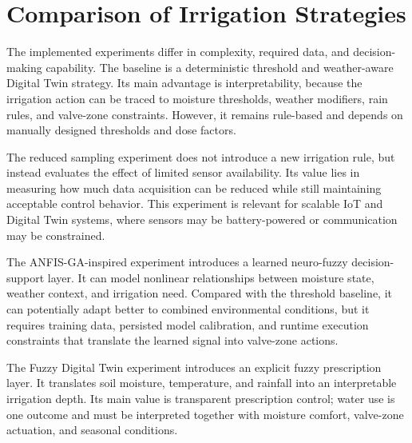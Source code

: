 \section{Comparison of Irrigation Strategies}
\label{sec:ch4sec5}

\par The implemented experiments differ in complexity, required data, and decision-making
    capability. The baseline is a deterministic threshold and weather-aware Digital Twin
    strategy. Its main advantage is interpretability, because the irrigation action can be
    traced to moisture thresholds, weather modifiers, rain rules, and valve-zone
    constraints. However, it remains rule-based and depends on manually designed
    thresholds and dose factors.

\par The reduced sampling experiment does not introduce a new irrigation rule, but instead
    evaluates the effect of limited sensor availability. Its value lies in measuring how
    much data acquisition can be reduced while still maintaining acceptable control
    behavior. This experiment is relevant for scalable IoT and Digital Twin systems, where
    sensors may be battery-powered or communication may be constrained.

\par The ANFIS-GA-inspired experiment introduces a learned neuro-fuzzy decision-support
    layer. It can model nonlinear relationships between moisture state, weather context,
    and irrigation need. Compared with the threshold baseline, it can potentially adapt
    better to combined environmental conditions, but it requires training data, persisted
    model calibration, and runtime execution constraints that translate the learned signal
    into valve-zone actions.

\par The Fuzzy Digital Twin experiment introduces an explicit fuzzy prescription layer. It
    translates soil moisture, temperature, and rainfall into an interpretable irrigation
    depth. Its main value is transparent prescription control; water use is one outcome
    and must be interpreted together with moisture comfort, valve-zone actuation, and
    seasonal conditions.

